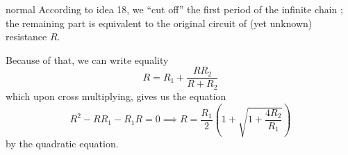 \begin{solution}{normal}
According to idea 18,  we “cut off” the first period of the infinite chain ; the remaining part is equivalent to the original circuit of (yet unknown) resistance $R$. 
\begin{center}
\end{center}
Because of that, we can write equality
\[R = R_1 + \frac{R R_2}{R + R_2}\]
which upon cross multiplying, gives us the equation 
\[R^2 - RR_1 - R_1 R = 0\implies R = \frac{R_1}{2}\left(1 + \sqrt{1 + \frac{4R_2}{R_1}}\right)\]
by the quadratic equation.
\end{solution}